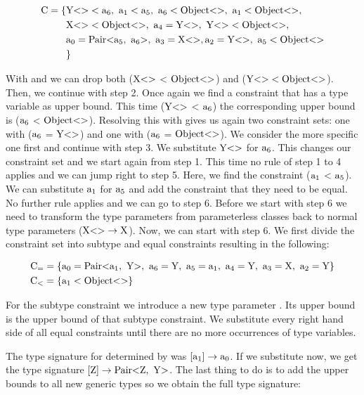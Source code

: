 \begin{align*}
    \text{C} = \{& \nvtt{Y}{} < \fa{6}, \ \fa{1} < \fa{5}, \ \fa{6} < \nvtt{Object}{}, \ \fa{1} < \nvtt{Object}{}, \\
    &\nvtt{X}{} < \nvtt{Object}{}, \ \fa{4} = \nvtt{Y}{}, \ \nvtt{Y}{} < \nvtt{Object}{}, \\
    &\fa{0} = \nvtt{Pair}{\fa{5}, \ \fa{6}}, \ \fa{3} = \nvtt{X}{}, \fa{2} = \nvtt{Y}{}, \ \fa{5} < \nvtt{Object}{} \\
    &\}
\end{align*}

With  and  we can drop both ($\text{X} \text{<}  \text{>}$ < $\text{Object} \text{<}  \text{>}$) and ($\text{Y} \text{<}  \text{>} < \text{Object} \text{<}  \text{>}$). Then, we continue with step 2.
Once again we find a constraint that has a type variable as upper bound. This time ($\text{Y} \text{<}  \text{>}$ < $\text{a}_{6}$) the corresponding upper bound is ($\text{a}_{6}$ < $\text{Object} \text{<}  \text{>}$).
Resolving this with  gives us again two constraint sets: one with ($\text{a}_{6}$ = $\text{Y} \text{<}  \text{>}$) and one with ($\text{a}_{6}$ = $\text{Object} \text{<}  \text{>}$). We consider the more specific one first and continue with step 3.
We substitute $\text{Y} \text{<}  \text{>}$ for $\text{a}_{6}$. This changes our constraint set and we start again from step 1. This time no rule of step 1 to 4 applies and we can jump right to step 5.
Here, we find the constraint ($\text{a}_{1}$ < $\text{a}_{5}$). We can substitute $\text{a}_{1}$ for $\text{a}_{5}$ and add the constraint that they need to be equal.
No further rule applies and we can go to step 6. Before we start with step 6 we need to transform the type parameters from parameterless classes back to normal type parameters ($\text{X} \text{<}  \text{>} \to \text{X}$). Now, we can start with step 6. We first divide the constraint set into subtype and equal constraints resulting in the following:

\begin{align*}
    \text{C}_= &= \{ \fa{0} = \nvtt{Pair}{\fa{1}, \ \text{Y}}, \ \fa{6} = \text{Y}, \ \fa{5} = \fa{1}, \ \fa{4} = \text{Y}, \ \fa{3} = \text{X}, \ \fa{2} = \text{Y} \}\\
    \text{C}_< &= \{ \fa{1} < \nvtt{Object}{} \}
\end{align*}

For the subtype constraint we introduce a new type parameter . Its upper bound is the upper bound of that subtype constraint.
We substitute every right hand side of all equal constraints until there are no more occurrences of type variables.

The type signature for  determined by  was $[\text{a}_{1}] \to \text{a}_{0}$. If we substitute now, we get the type signature $[\text{Z}] \to \text{Pair} \text{<} \text{Z}, \ \text{Y} \text{>}$.
The last thing to do is to add the upper bounds to all new generic types so we obtain the full type signature:

